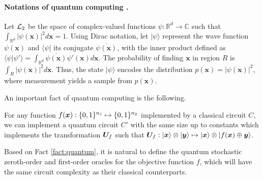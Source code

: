 	\paragraph{Notations of quantum computing \citep{nielsen2010quantum}.} Let ${\mathcal{L}}_2$ be the space of complex-valued functions $\psi: \mathbb{R}^d \rightarrow \mathbb{C}$ such that $\int_{\mathbb{R}^d} |\psi(\mathbf{x})|^2 d\mathbf{x} = 1$. Using Dirac notation, let $|\psi\rangle$ represent the wave function $\psi(\mathbf{x})$ and $\langle\psi|$ its conjugate $\overline{\psi(\mathbf{x})}$, with the inner product defined as $\langle \psi | \psi' \rangle = \int_{\mathbb{R}^d} \overline{\psi(\mathbf{x})} \psi'(\mathbf{x}) d\mathbf{x}$. The probability of finding $\mathbf{x}$ in region $R$ is $\int_R |\psi(\mathbf{x})|^2 d\mathbf{x}$. Thus, the state $|\psi\rangle$ encodes the distribution $p(\mathbf{x}) = |\psi(\mathbf{x})|^2$, where measurement yields a sample from $p(\mathbf{x})$.

	An important fact of quantum computing is the following.
	\begin{fact} \label{fact:quantum}
		For any function $f({\bm{x}}): \{0,1 \}^{n_1}  \mapsto \{0,1 \}^{n_2}$ implemented by a classical circuit $C$, we can implement a quantum circuit $C'$ with the same size up to constants which implements the transformation ${\bm{U}}_f$ such that ${\bm{U}}_f : | {\bm{x}} \rangle \otimes | {\bm{y}} \rangle \mapsto |{\bm{x}} \rangle \otimes | f({\bm{x}}) \oplus {\bm{y}} \rangle$.
	\end{fact}



	Based on Fact \ref{fact:quantum}, it is natural to define the quantum stochastic zeroth-order and first-order oracles for the objective function $f$, which will have the same circuit complexity as their classical counterparts.

